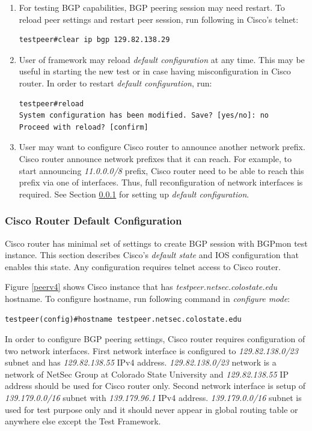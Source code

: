 \begin{enumerate}

\item{For testing BGP capabilities, BGP peering session may need restart.  To reload peer settings and restart peer session, run following in Cisco's telnet:}
\begin{verbatim}
testpeer#clear ip bgp 129.82.138.29
\end{verbatim}

\item{ User of framework may reload \emph{default configuration} at any time. This may be useful in starting the new test or in case having misconfiguration in Cisco router. In order to restart \emph{default configuration}, run:}
\begin{verbatim}
testpeer#reload
System configuration has been modified. Save? [yes/no]: no
Proceed with reload? [confirm]
\end{verbatim}

\item{User may want to configure Cisco router to announce another network prefix. Cisco router announce network prefixes that it can reach. For example, to start announcing \emph{11.0.0.0/8} prefix, Cisco router need to be able to reach this prefix via one of interfaces. Thus, full reconfiguration of network interfaces is required. See Section \ref{sec:ipv4ciscodef} for setting up \emph{default configuration}}. 

\end{enumerate}

\subsubsection{Cisco Router Default Configuration}
\label{sec:ipv4ciscodef}

Cisco router has minimal set of settings to create BGP session with BGPmon test instance.  This section describes Cisco's \emph{default state} and IOS configuration that enables this state. Any configuration requires telnet access to Cisco router. 

Figure \ref{peerv4} shows Cisco instance that has \emph{testpeer.netsec.colostate.edu} hostname. To configure hostname, run following command in \emph{configure mode}:
\begin{verbatim}
testpeer(config)#hostname testpeer.netsec.colostate.edu
\end{verbatim}

In order to configure BGP peering settings, Cisco router requires configuration of two network interfaces.  First network interface is configured to \emph{129.82.138.0/23} subnet and has \emph{129.82.138.55} IPv4 address. \emph{129.82.138.0/23} network is a network of NetSec Group at Colorado State University and \emph{129.82.138.55} IP address should be used for Cisco router only.   Second network interface is setup of \emph{139.179.0.0/16} subnet with \emph{139.179.96.1} IPv4 address. \emph{139.179.0.0/16} subnet is used for test purpose only and it should never appear in global routing table or anywhere else except the Test Framework. 

